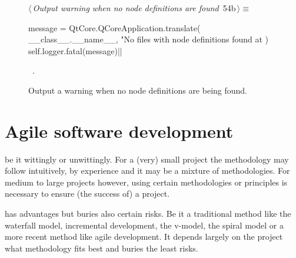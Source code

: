 \documentclass[%
    a4paper,    %
    justified,  %
    nobib,      %
    openany     %
]{tufte-book}
\makeatletter
\renewcommand{\label}[1]{\@tufte@label{##1}}%
\makeatother
\begin{document}
\begin{figure}[!htbp]
  \begin{flushleft} \small
\begin{minipage}{\linewidth}\label{scrap10}\raggedright\small
{} $\langle\,${\itshape Output warning when no node definitions are found}\nobreak\ {\footnotesize {54b}}$\,\rangle\equiv$
\vspace{-1ex}
\begin{pythoncode}
    message = QtCore.QCoreApplication.translate(
        __class__.__name__,
        "No files with node definitions found at %
    )
    self.logger.fatal(message)|\NWsep|
\end{pythoncode}
\vspace{1.5ex}
\footnotesize
\begin{list}{}{\setlength{\itemsep}{-\parsep}\setlength{\itemindent}{-\leftmargin}}
\item \NWtxtMacroRefIn\ .

\item{}
\end{list}
\end{minipage}\vspace{4ex}
\end{flushleft}
\caption{Output a warning when no node definitions are being found.}
\end{figure}

\section{Agile software development}
\label{sec:agile-software-development}

 be it wittingly
or unwittingly. For a (very) small project the methodology may follow intuitively,
by experience and it may be a mixture of methodologies. For medium to large
projects however, using certain methodologies or principles is necessary to
ensure (the success of) a project.

 has advantages
but buries also certain risks. Be it a traditional method like the waterfall
model, incremental development, the v-model, the spiral model or a more recent
method like agile development. It depends largely on the project what
methodology fits best and buries the least risks.~\cite{haneen-risk-2012,
mens-se-2008}
\end{document}
